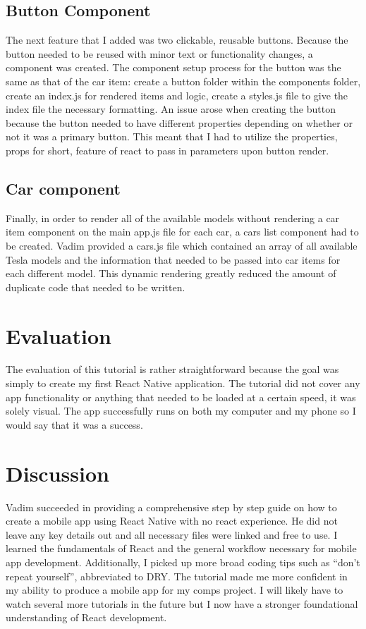 \documentclass[10pt,twocolumn]{article}
\begin{document}
\subsection{Button Component}
	
	The next feature that I added was two clickable, reusable buttons. Because the button needed to be reused with minor text or functionality changes, a component was created. The component setup process for the button was the same as that of the car item: create a button folder within the components folder, create an index.js for rendered items and logic, create a styles.js file to give the index file the necessary formatting. An issue arose when creating the button because the button needed to have different properties depending on whether or not it was a primary button. This meant that I had to utilize the properties, props for short, feature of react to pass in parameters upon button render. 

\subsection{Car component}

	Finally, in order to render all of the available models without rendering a car item component on the main app.js file for each car, a cars list component had to be created. Vadim provided a cars.js file which contained an array of all available Tesla models and the information that needed to be passed into car items for each different model. This dynamic rendering greatly reduced the amount of duplicate code that needed to be written. 
\section{Evaluation}

    The evaluation of this tutorial is rather straightforward because the goal was simply to create my first React Native application. The tutorial did not cover any app functionality or anything that needed to be loaded at a certain speed, it was solely visual. The app successfully runs on both my computer and my phone so I would say that it was a success. 

\section{Discussion}

    Vadim succeeded in providing a comprehensive step by step guide on how to create a mobile app using React Native with no react experience. He did not leave any key details out and all necessary files were linked and free to use. I learned the fundamentals of React and the general workflow necessary for mobile app development. Additionally, I picked up more broad coding tips such as “don’t repeat yourself”, abbreviated to DRY. The tutorial made me more confident in my ability to produce a mobile app for my comps project. I will likely have to watch several more tutorials in the future but I now have a stronger foundational understanding of React development.
    
\end{document}
